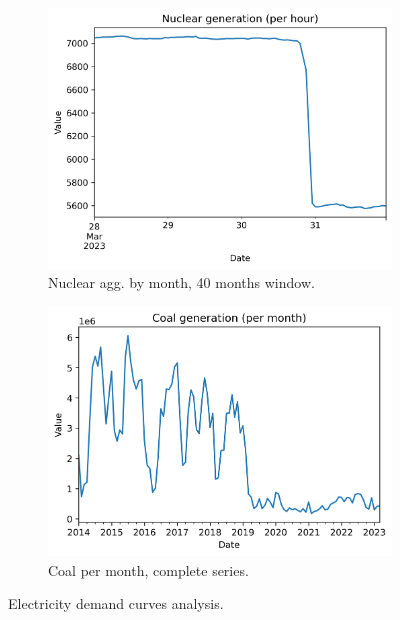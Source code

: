 \begin{figure}[H]\ContinuedFloat
    \begin{subfigure}{.43\textwidth}
        \centering
        \includegraphics[width=1\linewidth]{images/variable_analysis/esios_generation_nuclear_h_96}
        \caption{Nuclear agg. by month, 40 months window.}
        \label{fig:nuclear-series}
    \end{subfigure}
    \begin{subfigure}{.47\textwidth}
        \centering
        \includegraphics[width=1\linewidth]{images/variable_analysis/esios_generation_coal_m_all}
        \caption{Coal per month, complete series.}
        \label{fig:coal-series}
    \end{subfigure}

    \caption{Electricity demand curves analysis.}
    \label{fig:generation-series}
\end{figure}


